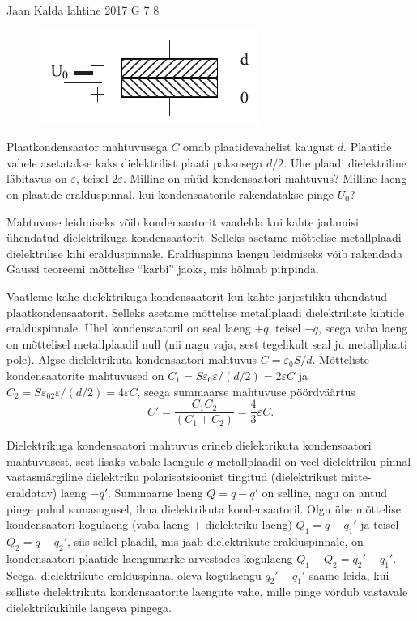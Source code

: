 {Jaan Kalda} %
{lahtine} %
{2017} %
{G 7} %
{8} %
{
\ifStatement
\begin{figure}
	\vspace{-13pt}
	\includegraphics[width=\linewidth]{2017-lahg-07-res-cap2.pdf}
\end{figure}

Plaatkondensaator mahtuvusega $C$ omab plaatidevahelist kaugust $d$. Plaatide vahele asetatakse kaks dielektrilist plaati paksusega $d/2$. Ühe plaadi dielektriline läbitavus on $\varepsilon$, teisel $2\varepsilon$. Milline on nüüd kondensaatori mahtuvus? Milline laeng on plaatide eralduspinnal, kui kondensaatorile rakendatakse pinge $U_0$?
\fi


\ifHint
Mahtuvuse leidmiseks võib kondensaatorit vaadelda kui kahte jadamisi ühendatud dielektrikuga kondensaatorit. Selleks asetame mõttelise metallplaadi dielektrilise kihi eralduspinnale. Eralduspinna laengu leidmiseks võib rakendada Gaussi teoreemi mõttelise \enquote{karbi} jaoks, mis hõlmab piirpinda.
\fi


\ifSolution
Vaatleme kahe dielektrikuga kondensaatorit kui kahte järjestikku ühendatud plaatkondensaatorit. Selleks asetame mõttelise metallplaadi dielektriliste kihtide eralduspinnale. Ühel kondensaatoril on seal laeng $+q$, teisel $-q$, seega vaba laeng on mõttelisel metallplaadil null (nii nagu vaja, sest tegelikult seal ju metallplaati pole). Algse dielektrikuta kondensaatori mahtuvus $C=\varepsilon_0S/d$. Mõtteliste kondensaatorite mahtuvused on $C_1=S\varepsilon_0\varepsilon/(d/2)=2\varepsilon C$ ja $C_2=S\varepsilon_02\varepsilon/(d/2)=4\varepsilon C$, seega summaarse mahtuvuse pöördväärtus 
\[
C'=\frac{C_1C_2}{(C_1+C_2)}=\frac 43\varepsilon C.
\]

Dielektrikuga kondensaatori mahtuvus erineb dielektrikuta kondensaatori mahtuvusest, sest lisaks vabale laengule $q$ metallplaadil on veel dielektriku pinnal vastasmärgiline dielektriku polarisatsioonist tingitud (dielektrikust mitte-eraldatav) laeng $-q'$. Summaarne laeng $Q=q-q'$ on selline, nagu on antud pinge puhul samasugusel, ilma dielektrikuta kondensaatoril. Olgu ühe mõttelise kondensaatori kogulaeng (vaba laeng + dielektriku laeng) $Q_1=q-q_1'$ ja teisel $Q_2=q-q_2'$, siis sellel plaadil, mis jääb dielektrikute eralduspinnale, on kondensaatori plaatide laengumärke arvestades kogulaeng $Q_1-Q_2=q_2'-q_1'$. Seega, dielektrikute eralduspinnal oleva kogulaengu $q_2'-q_1'$ saame leida, kui selliste dielektrikuta kondensaatorite laengute vahe, mille pinge võrdub vastavale dielektrikukihile langeva pingega. 

}
